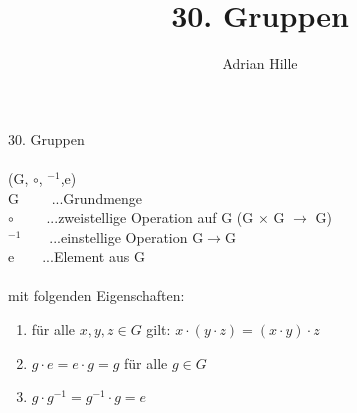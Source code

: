 \documentclass{scrartcl}\usepackage[utf8]{inputenc}
\title{30. Gruppen}
\author{Adrian Hille}
\begin{document}
\Large 30. Gruppen\\
\\
\normalsize
(G, $\circ$, $^{-1}$,e)\\
G $\qquad$...Grundmenge\\
$\circ$ $\qquad$...zweistellige Operation auf G (G $\times$ G $\to$ G)\\
$^{-1}$$\qquad$...einstellige Operation G$\to$G\\
e$\qquad$...Element aus G\\
\\
mit folgenden Eigenschaften:\\
\begin{enumerate}
	\item f\"ur alle $x,y,z \in G$ gilt: $x \cdot (y \cdot z) = (x \cdot y) \cdot z$
	\item $g \cdot e = e \cdot  g = g$ f\"ur alle $g \in G$
	\item $g \cdot g^{-1} = g^{-1} \cdot g = e$
	\end{enumerate}
\end{document}
